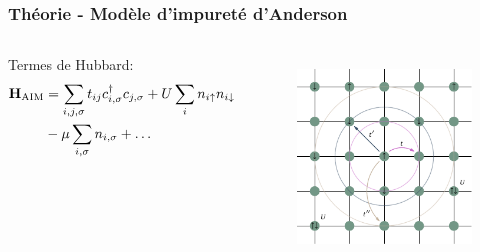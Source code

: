 \begin{frame}
    \frametitle{Théorie - Modèle d'impureté d'Anderson}
    \begin{columns}
        Termes de Hubbard:
        {\scriptsize
        \begin{align*}
            \vb{H}_{\text{AIM}} &= \sum_{i,j,\sigma}t_{ij}c_{i,\sigma}^\dagger c_{j,\sigma} + U\sum_in_{i\uparrow}n_{i\downarrow} \\
                                &- \mu\sum_{i,\sigma}n_{i,\sigma} + \dots
        \end{align*}
        }
        \begin{figure}
           \centering
            \includegraphics[scale=0.95]{./figures/theory/2d_lattice.pdf}
            \label{fig: hubbard_2d}
        \end{figure}
    \end{columns}
\end{frame}

